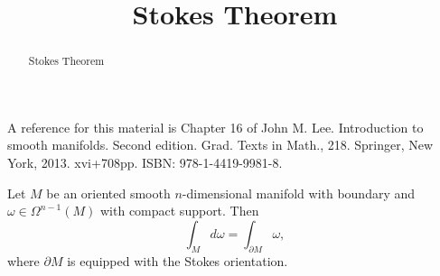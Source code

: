 \documentclass{ximera}
\title{Stokes Theorem}
\begin{document}
    \begin{abstract} Stokes Theorem  \end{abstract}
    \maketitle




    A reference for this material is Chapter 16 of John M. Lee. Introduction to smooth manifolds. Second edition. Grad. Texts in Math., 218. Springer, New York, 2013. xvi+708pp. ISBN: 978-1-4419-9981-8.

\begin{theorem}[Stokes] 
Let $M$ be an oriented smooth $n$-dimensional manifold with boundary and $\omega \in \Omega ^{n-1} (M)$ with compact support. Then
\[     \int_M d \omega = \int_{\partial M} \omega ,                \]
 where $\partial M$ is equipped with the Stokes orientation.   
\end{theorem}
\end{document}
